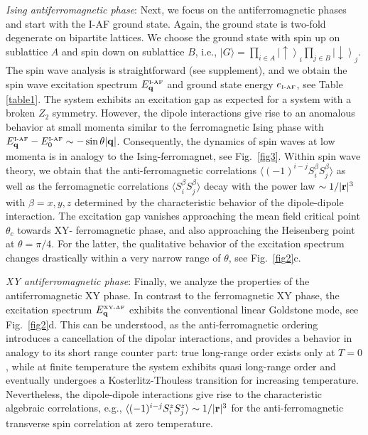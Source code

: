 {\it Ising antiferromagnetic phase}: Next, we focus on the antiferromagnetic phases and start with the I-AF ground state.
Again, the ground state is two-fold degenerate on bipartite lattices.  We choose the ground state with spin up on sublattice $A$
and spin down on sublattice $B$, i.e., $|G\rangle = \prod_{i \in A} \left|\uparrow\right\rangle_{i} \prod_{j\in B} \left|\downarrow\right\rangle_{j}$.
The spin wave analysis is straightforward (see supplement), and we obtain
the spin wave excitation spectrum $ E^{\mbox{\tiny I-AF}}_{\bf q}$ and ground state energy $ e_{\mbox{\tiny I-AF}}$, see Table \ref{table1}.
The system exhibits an excitation gap as expected for a system with a broken $Z_{2}$ symmetry.
However, the dipole interactions give rise to an anomalous behavior at small momenta similar to
the ferromagnetic Ising phase with  $E^{\mbox{\tiny I-AF}}_{\bf q}- E^{\mbox{\tiny I-AF}}_{0} \sim -
\sin \theta |{\bf q}|$.  Consequently, the dynamics of spin waves at low momenta is in analogy to the
Ising-ferromagnet,  see Fig.~\ref{fig3}.  Within spin wave theory, we obtain that the anti-ferromagnetic correlations
$\langle (-1)^{i-j} S_{i}^{\beta}S_{j}^{\beta} \rangle$
as well as the ferromagnetic correlations  $\langle S_{i}^{\beta}S_{j}^{\beta} \rangle$ decay with the
power law  $\sim1/ |{\bf r}|^{3}$ with $\beta = x,y,z$ determined by the characteristic behavior of the dipole-dipole interaction.
The excitation gap vanishes approaching the mean field critical point $\theta_{c}$ towards XY- ferromagnetic
phase, and also approaching the Heisenberg point at $\theta = \pi/4$. For the latter, the qualitative behavior of the excitation spectrum
changes drastically within a very narrow range of $\theta$, see Fig.~\ref{fig2}c.



{\it XY antiferromagnetic phase}:  Finally, we analyze  the properties of the antiferromagnetic XY phase.
In contrast to the ferromagnetic XY phase, the excitation spectrum  $E^{\mbox{\tiny XY-AF}}_{\bf q}$
exhibits the conventional linear Goldstone mode, see Fig.~\ref{fig2}d. This can be understood, as the
anti-ferromagnetic ordering introduces a cancellation of the dipolar interactions, and provides a behavior in analogy to
its short range counter part: true long-range order exists only at $T=0$, while at finite temperature the system
exhibits quasi long-range order and eventually undergoes a Kosterlitz-Thouless transition for increasing temperature.
Nevertheless, the dipole-dipole interactions give rise to the characteristic algebraic correlations, e.g.,
$\langle (-1)^{i-j}S_{i}^{z}S_{j}^{z} \rangle \sim 1/|{\bf r}|^3$ for the anti-ferromagnetic transverse spin correlation at zero temperature.



